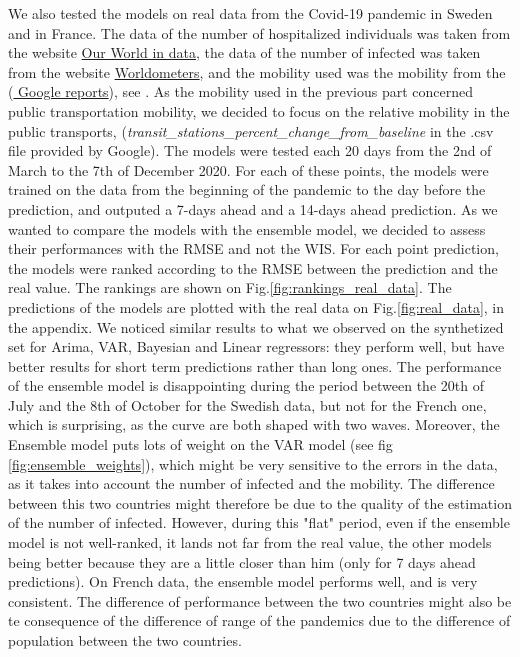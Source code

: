 We also tested the models on real data from the Covid-19 pandemic in Sweden and in France. 
The data of the number of hospitalized individuals was taken from the website \href{https://ourworldindata.org/covid-hospitalizations}{Our World in data}, the data of the number of infected was taken from the website \href{ https://www.worldometers.info/coronavirus/country/sweden/#coronavirus-cases-linear}{Worldometers}, and the mobility used was the mobility from the (\href{https://www.google.com/covid19/mobility/}{ Google reports}), see \cite{google_covid19_mobility}. 
As the mobility used in the previous part concerned public transportation mobility, we decided to focus on the relative mobility in the public transports, (\textit{transit\_stations\_percent\_change\_from\_baseline} in the .csv file provided by Google).
The models were tested each 20 days from the 2nd of March to the 7th of December 2020. 
For each of these points, the models were trained on the data from the beginning of the pandemic to the day before the prediction, and outputed a 7-days ahead and a 14-days ahead prediction. 
As we wanted to compare the models with the ensemble model, we decided to assess their performances with the RMSE and not the WIS. 
For each point prediction, the models were ranked according to the RMSE between the prediction and the real value. 
The rankings are shown on Fig.\ref{fig:rankings_real_data}. 
The predictions of the models are plotted with the real data on Fig.\ref{fig:real_data}, in the appendix. 
We noticed similar results to what we observed on the synthetized set for Arima, VAR, Bayesian and Linear regressors: they perform well, but have better results for short term predictions rather than long ones. 
The performance of the ensemble model is disappointing during the period between the 20th of July and the 8th of October for the Swedish data, but not for the French one, which is surprising, as the curve are both shaped with two waves. 
Moreover, the Ensemble model puts lots of weight on the VAR model (see fig \ref{fig:ensemble_weights}), which might be very sensitive to the errors in the data, as it takes into account the number of infected and the mobility.
The difference between this two countries might therefore be due to the quality of the estimation of the number of infected. 
However, during this "flat" period,  even if the ensemble model is not well-ranked, it lands not far from the real value, the other models being better because they are a little closer than him (only for 7 days ahead predictions). 
On French data, the ensemble model performs well, and is very consistent. 
The difference of performance between the two countries might also be te consequence of the difference of range of the pandemics due to the difference of population between the two countries. 

